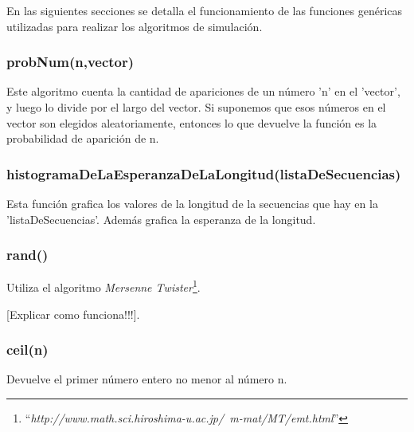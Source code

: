 \documentclass{article}
\begin{document}
En las siguientes secciones se detalla el funcionamiento de las funciones genéricas utilizadas para realizar los algoritmos de simulación.

\subsubsection{probNum(n,vector)}

Este algoritmo cuenta la cantidad de apariciones de un número 'n' en el 'vector', y luego lo divide por el largo del vector. Si suponemos que esos números en el vector son elegidos aleatoriamente, entonces lo que devuelve la función es la probabilidad de aparición de n.

\subsubsection{histogramaDeLaEsperanzaDeLaLongitud(listaDeSecuencias)}

Esta función grafica los valores de la longitud de la secuencias que hay en la 'listaDeSecuencias'. Además grafica la esperanza de la longitud.

\subsubsection{rand()}

Utiliza el algoritmo \textit{Mersenne Twister}\footnote{``\textit{http://www.math.sci.hiroshima-u.ac.jp/~m-mat/MT/emt.html}''}.

[Explicar como funciona!!!].


\subsubsection{ceil(n)}

Devuelve el primer número entero no menor al número n.
\end{document}
